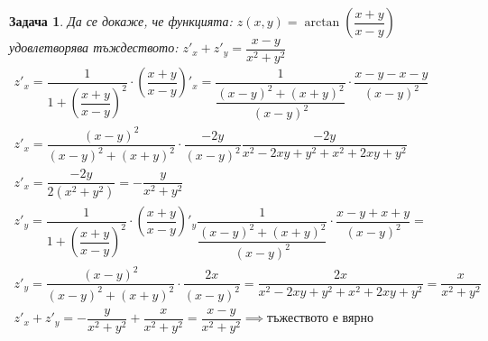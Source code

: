 \documentclass[a4paper,fleqn,12pt]{article}
\newtheorem{task}{Задача}[section]
\begin{document}
\begin{task}
Да се докаже, че функцията: $z(x,y) = \arctan{\left( \dfrac{x+y}{x-y} \right)}$ удовлетворява тъждеството: $z'_x + z'_y = \dfrac{x-y}{x^2 + y^2}$
\begin{gather*}
z'_x = \dfrac{1}{1 + \left( \dfrac{x+y}{x-y} \right)^2} \cdot \left( \dfrac{x+y}{x-y} \right)'_x =  \dfrac{1}{\dfrac{(x-y)^2 + (x+y)^2}{(x-y)^2}} \cdot \dfrac{x-y-x-y}{(x-y)^2} \\
z'_x = \dfrac{(x-y)^2}{(x-y)^2 + (x+y)^2} \cdot \dfrac{-2y}{(x-y)^2}\dfrac{-2y}{x^2 -2xy+y^2 + x^2+2xy+y^2} \\
z'_x = \dfrac{-2y}{2(x^2+y^2)} =  -\dfrac{y}{x^2+y^2} \\
z'_y = \dfrac{1}{1 + \left( \dfrac{x+y}{x-y} \right)^2} \cdot \left( \dfrac{x+y}{x-y} \right)'_y  \dfrac{1}{\dfrac{(x-y)^2 + (x+y)^2}{(x-y)^2}} \cdot \dfrac{x-y+x+y}{(x-y)^2} = \\
z'_y = \dfrac{(x-y)^2}{(x-y)^2 + (x+y)^2} \cdot \dfrac{2x}{(x-y)^2} = \dfrac{2x}{x^2 -2xy+y^2 + x^2+2xy+y^2} = \dfrac{x}{x^2+y^2}\\
z'_x + z'_y = -\dfrac{y}{x^2+y^2} + \dfrac{x}{x^2+y^2} = \dfrac{x-y}{x^2+y^2} \implies \text{тъжеството е вярно}
\end{gather*}
\end{task}
\end{document}
